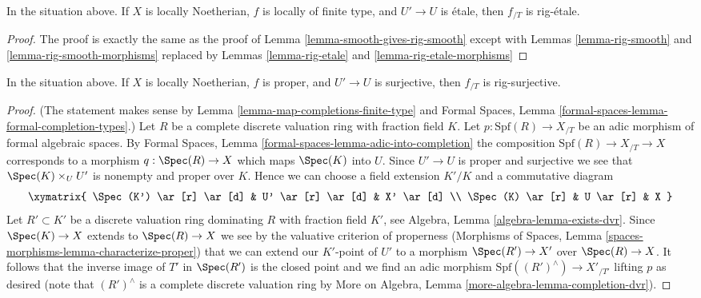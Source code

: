 \begin{lemma}
\label{lemma-etale-gives-rig-etale}
In the situation above. If $X$ is locally Noetherian,
$f$ is locally of finite type, and $U' \to U$ is \'etale, then
$f_{/T}$ is rig-\'etale.
\end{lemma}

\begin{proof}
The proof is exactly the same as the proof of
Lemma \ref{lemma-smooth-gives-rig-smooth} except with
Lemmas \ref{lemma-rig-smooth} and \ref{lemma-rig-smooth-morphisms}
replaced by
Lemmas \ref{lemma-rig-etale} and \ref{lemma-rig-etale-morphisms}
\end{proof}

\begin{lemma}
\label{lemma-completion-proper-surjective-rig-surjective}
In the situation above. If $X$ is locally Noetherian,
$f$ is proper, and $U' \to U$ is surjective, then $f_{/T}$ is rig-surjective.
\end{lemma}

\begin{proof}
(The statement makes sense by
Lemma \ref{lemma-map-completions-finite-type} and
Formal Spaces, Lemma \ref{formal-spaces-lemma-formal-completion-types}.)
Let $R$ be a complete discrete valuation ring with fraction field $K$.
Let $p : \text{Spf}(R) \to X_{/T}$ be an adic morphism of
formal algebraic spaces. By Formal Spaces, Lemma
\ref{formal-spaces-lemma-adic-into-completion}
the composition $\text{Spf}(R) \to X_{/T} \to X$
corresponds to a morphism $q : \Spec(R) \to X$
which maps $\Spec(K)$ into $U$. Since $U' \to U$ is proper and surjective
we see that $\Spec(K) \times_U U'$ is nonempty and proper over $K$.
Hence we can choose a field extension $K'/K$ and a commutative
diagram
$$
\xymatrix{
\Spec(K') \ar[r] \ar[d] & U' \ar[r] \ar[d] & X' \ar[d] \\
\Spec(K) \ar[r] & U \ar[r] & X
}
$$
Let $R' \subset K'$ be a discrete valuation ring dominating $R$
with fraction field $K'$, see Algebra, Lemma \ref{algebra-lemma-exists-dvr}.
Since $\Spec(K) \to X$ extends to $\Spec(R) \to X$ we see by the valuative
criterion of properness
(Morphisms of Spaces, Lemma \ref{spaces-morphisms-lemma-characterize-proper})
that we can extend our $K'$-point of $U'$ to a morphism
$\Spec(R') \to X'$ over $\Spec(R) \to X$.
It follows that the inverse image of $T'$ in $\Spec(R')$ is the
closed point and we find an adic morphism
$\text{Spf}((R')^\wedge) \to X'_{/T'}$ lifting $p$
as desired (note that $(R')^\wedge$ is a complete discrete valuation ring
by More on Algebra, Lemma \ref{more-algebra-lemma-completion-dvr}).
\end{proof}

